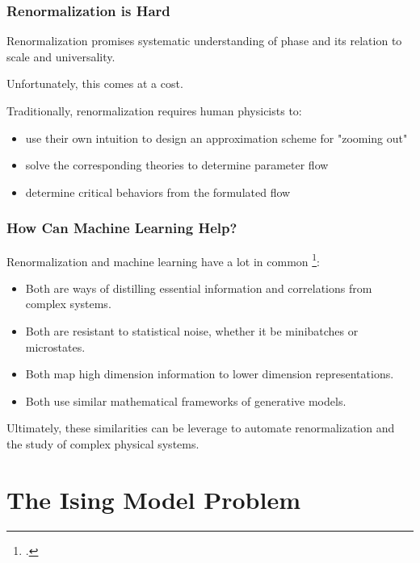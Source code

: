 \documentclass[aspectratio=169, 12pt]{beamer}
\begin{document}
\begin{frame}

    \frametitle{Renormalization is \textbf{Hard}}

    Renormalization promises systematic understanding of phase and its relation to scale and universality. 

    \vspace{1em}

    Unfortunately, this comes at a cost. 

    \vspace{1em}
    
    Traditionally, renormalization requires human physicists to:

    \begin{itemize}
        \item use their own intuition to design an approximation scheme for "zooming out"
        \item solve the corresponding theories to determine parameter flow
        \item determine critical behaviors from the formulated flow
    \end{itemize}

\end{frame}

\begin{frame}

    \frametitle{How Can Machine Learning Help?}

    Renormalization and machine learning have a lot in common \footcite{mlrg}:

    \begin{itemize}
        \item Both are ways of distilling essential information and correlations from complex systems. 
        \item Both are resistant to statistical noise, whether it be minibatches or microstates. 
        \item Both map high dimension information to lower dimension representations. 
        \item Both use similar mathematical frameworks of generative models. 
    \end{itemize}

    Ultimately, these similarities can be leverage to automate renormalization and the study of complex physical systems. 

\end{frame}

\section{The Ising Model Problem}
\end{document}
